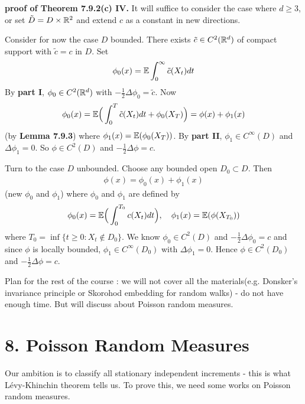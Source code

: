 \documentclass[12pt,a4paper]{report}
\newenvironment{proof}
{\begin{changemargin}{1cm}{0.5cm} 
	}%
	{\end{changemargin}
}
\begin{document}
\begin{proof}
\textbf{\textbf{proof of Theorem 7.9.2(c) IV.}} It will suffice to consider the case where $d\geq 3$, or set $\tilde{D} = D \times \mathbb{R}^2$ and extend $c$ as a constant in new directions. 

\quad Consider for now the case $D$ bounded. There exists $\tilde{c} \in C^2(\mathbb{R}^d)$ of compact support with $\tilde{c} = c$ in $D$. Set
\begin{align*}
\phi_0(x) = \mathbb{E} \int_0^{\infty} \tilde{c}(X_t) dt
\end{align*}
By \textbf{part I}, $\phi_0 \in C^2(\mathbb{R}^d)$ with $-\frac{1}{2}\Delta \phi_0 = \tilde{c}$. Now
\begin{align*}
\phi_0(x) = \mathbb{E} \Big( \int_0^T \tilde{c}(X_t) dt + \phi_0(X_T) \Big) = \phi(x) + \phi_1(x)
\end{align*}
(by \textbf{Lemma 7.9.3}) where $\phi_1(x)  = \mathbb{E}(\phi_0(X_T))$. By \textbf{part II}, $\phi_1 \in C^{\infty}(D)$ and $\Delta \phi_1 =0$. So $\phi \in C^2 (D)$ and $-\frac{1}{2} \Delta \phi =c$.

\quad Turn to the case $D$ unbounded. Choose any bounded open $D_0 \subset D$. Then
\begin{align*}
\phi (x) = \phi_0(x) + \phi_1(x)
\end{align*}
(new $\phi_0$ and $\phi_1$) where $\phi_0$ and $\phi_1$ are defined by
\begin{align*}
\phi_0(x) = \mathbb{E} \Big( \int_0^{T_0} c(X_t) dt \Big), \quad \phi_1(x) = \mathbb{E}(\phi(X_{T_0}))
\end{align*}
where $T_0  = \inf \{ t\geq 0 : X_t \not\in D_0 \}$. We know $\phi_0 \in C^2(D)$ and $-\frac{1}{2}\Delta \phi_0 = c$ and since $\phi$ is locally bounded, $\phi_1 \in C^{\infty}(D_0)$ with $\Delta \phi_1 =0$. Hence $\phi \in C^2(D_0)$ and $-\frac{1}{2}\Delta \phi =c$.

\eop
\end{proof}
\s

Plan for the rest of the course : we will not cover all the materials(e.g. Donsker's invariance principle or Skorohod embedding for random walks) - do not have enough time. But will discuss about Poisson random measures.

\section*{8. Poisson Random Measures}

Our ambition is to classify all stationary independent increments - this is what L\'{e}vy-Khinchin theorem tells us. To prove this, we need some works on Poisson random measures.
\end{document}
